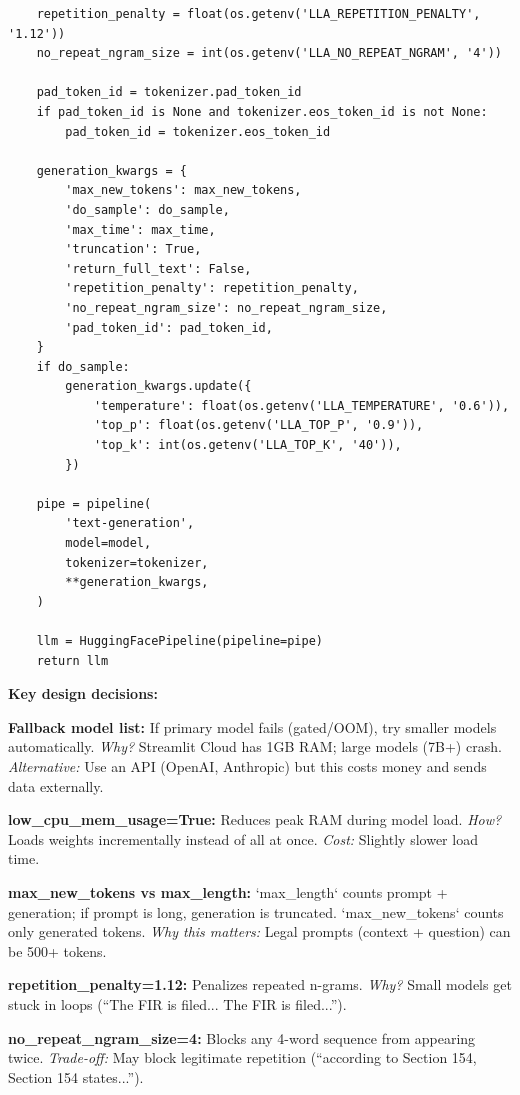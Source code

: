 \documentclass[11pt,a4paper]{article}
\begin{document}
\begin{lstlisting}
    repetition_penalty = float(os.getenv('LLA_REPETITION_PENALTY', '1.12'))
    no_repeat_ngram_size = int(os.getenv('LLA_NO_REPEAT_NGRAM', '4'))

    pad_token_id = tokenizer.pad_token_id
    if pad_token_id is None and tokenizer.eos_token_id is not None:
        pad_token_id = tokenizer.eos_token_id

    generation_kwargs = {
        'max_new_tokens': max_new_tokens,
        'do_sample': do_sample,
        'max_time': max_time,
        'truncation': True,
        'return_full_text': False,
        'repetition_penalty': repetition_penalty,
        'no_repeat_ngram_size': no_repeat_ngram_size,
        'pad_token_id': pad_token_id,
    }
    if do_sample:
        generation_kwargs.update({
            'temperature': float(os.getenv('LLA_TEMPERATURE', '0.6')),
            'top_p': float(os.getenv('LLA_TOP_P', '0.9')),
            'top_k': int(os.getenv('LLA_TOP_K', '40')),
        })

    pipe = pipeline(
        'text-generation',
        model=model,
        tokenizer=tokenizer,
        **generation_kwargs,
    )

    llm = HuggingFacePipeline(pipeline=pipe)
    return llm
\end{lstlisting}

\textbf{Key design decisions:}

\textbf{Fallback model list:} If primary model fails (gated/OOM), try smaller models automatically. \textit{Why?} Streamlit Cloud has 1GB RAM; large models (7B+) crash. \textit{Alternative:} Use an API (OpenAI, Anthropic) but this costs money and sends data externally.

\textbf{low\_cpu\_mem\_usage=True:} Reduces peak RAM during model load. \textit{How?} Loads weights incrementally instead of all at once. \textit{Cost:} Slightly slower load time.

\textbf{max\_new\_tokens vs max\_length:} `max\_length` counts prompt + generation; if prompt is long, generation is truncated. `max\_new\_tokens` counts only generated tokens. \textit{Why this matters:} Legal prompts (context + question) can be 500+ tokens.

\textbf{repetition\_penalty=1.12:} Penalizes repeated n-grams. \textit{Why?} Small models get stuck in loops (``The FIR is filed... The FIR is filed...'').

\textbf{no\_repeat\_ngram\_size=4:} Blocks any 4-word sequence from appearing twice. \textit{Trade-off:} May block legitimate repetition (``according to Section 154, Section 154 states...'').
\end{document}
